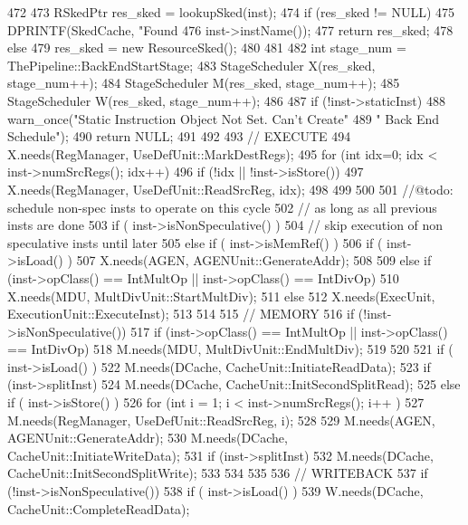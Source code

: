 \begin{DoxyCode}
472 {
473     RSkedPtr res_sked = lookupSked(inst);
474     if (res_sked != NULL) {
475         DPRINTF(SkedCache, "Found %
476                 inst->instName());
477         return res_sked;
478     } else {
479         res_sked = new ResourceSked();
480     }
481 
482     int stage_num = ThePipeline::BackEndStartStage;
483     StageScheduler X(res_sked, stage_num++);
484     StageScheduler M(res_sked, stage_num++);
485     StageScheduler W(res_sked, stage_num++);
486 
487     if (!inst->staticInst) {
488         warn_once("Static Instruction Object Not Set. Can't Create"
489                   " Back End Schedule");
490         return NULL;
491     }
492 
493     // EXECUTE
494     X.needs(RegManager, UseDefUnit::MarkDestRegs);
495     for (int idx=0; idx < inst->numSrcRegs(); idx++) {
496         if (!idx || !inst->isStore()) {
497             X.needs(RegManager, UseDefUnit::ReadSrcReg, idx);
498         }
499     }
500 
501     //@todo: schedule non-spec insts to operate on this cycle
502     // as long as all previous insts are done
503     if ( inst->isNonSpeculative() ) {
504         // skip execution of non speculative insts until later
505     } else if ( inst->isMemRef() ) {
506         if ( inst->isLoad() ) {
507             X.needs(AGEN, AGENUnit::GenerateAddr);
508         }
509     } else if (inst->opClass() == IntMultOp || inst->opClass() == IntDivOp) {
510         X.needs(MDU, MultDivUnit::StartMultDiv);
511     } else {
512         X.needs(ExecUnit, ExecutionUnit::ExecuteInst);
513     }
514 
515     // MEMORY
516     if (!inst->isNonSpeculative()) {
517         if (inst->opClass() == IntMultOp || inst->opClass() == IntDivOp) {
518             M.needs(MDU, MultDivUnit::EndMultDiv);
519         }
520 
521         if ( inst->isLoad() ) {
522             M.needs(DCache, CacheUnit::InitiateReadData);
523             if (inst->splitInst)
524                 M.needs(DCache, CacheUnit::InitSecondSplitRead);
525         } else if ( inst->isStore() ) {
526             for (int i = 1; i < inst->numSrcRegs(); i++ ) {
527                 M.needs(RegManager, UseDefUnit::ReadSrcReg, i);
528             }
529             M.needs(AGEN, AGENUnit::GenerateAddr);
530             M.needs(DCache, CacheUnit::InitiateWriteData);
531             if (inst->splitInst)
532                 M.needs(DCache, CacheUnit::InitSecondSplitWrite);
533         }
534     }
535 
536     // WRITEBACK
537     if (!inst->isNonSpeculative()) {
538         if ( inst->isLoad() ) {
539             W.needs(DCache, CacheUnit::CompleteReadData);
}}}
\end{DoxyCode}
